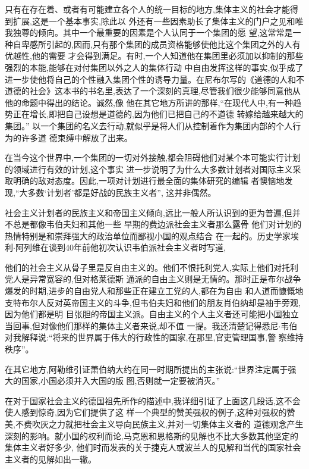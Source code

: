 ﻿\documentclass[12pt]{article}
\begin{document}
只有在存在着、或者有可能建立各个人的统一目标的地方,集体主义的社会才能得到扩展,这是一个基本事实,除此以
外还有一些因素助长了集体主义的门户之见和唯我独尊的倾向。其中一个最重要的因素是个人认同于一个集团的愿
望,这常常是一种自卑感所引起的,因而,只有那个集团的成员资格能够使他比这个集团之外的人有优越性,他的需要
才会得到满足。有时,一个人知道他在集团里必须加以抑制的那些强烈的本能,能够在对付集团以外之人的集体行动
中自由发挥这样的事实,似乎成了进一步使他将自己的个性融入集团个性的诱导力量。在尼布尔写的《道德的人和不
道德的社会》这本书的书名里,表达了一个深刻的真理,尽管我们很少能够同意他从他的命题中得出的结论。诚然,像
他在其它地方所讲的那样,``在现代人中,有一种趋势正在增长,即把自己设想是道德的,因为他们已把自己的不道德
转嫁给越来越大的集团。'' 以一个集团的名义去行动,就似乎是将人们从控制着作为集团内部的个人行为的许多道
德束缚中解放了出来。

在当今这个世界中,一个集团的一切对外接触,都会阻碍他们对某个本可能实行计划的领域进行有效的计划,这个事实
进一步说明了为什么大多数计划者对国际主义采取明确的敌对态度。因此,一项对计划进行最全面的集体研究的编辑
者懊恼地发现,``大多数‘计划者’都是好战的民族主义者'', 这并非偶然。

社会主义计划者的民族主义和帝国主义倾向,远比一般人所认识到的更为普遍,但并不总是都像韦伯夫妇和其他一些
早期的费边派社会主义者那么露骨 \myrule 他们对计划的热情特别是和崇拜强大的政治单位而鄙视小国的观点结合
在一起的。历史学家埃利$\cdot$阿列维在谈到40年前他初次认识韦伯派社会主义者时写道,

他们的社会主义从骨子里是反自由主义的。他们不恨托利党人,实际上他们对托利党人是异常宽容的,但对格莱德斯
通派的自由主义则是无情的。那时正是布尔战争爆发的时期,进步的自由党人和那些正在建立工党的人,都在为自由
和人道而慷慨地支特布尔人反对英帝国主义的斗争,但韦伯夫妇和他们的朋友肖伯纳却是袖手旁观,因为他们都是明
目张胆的帝国主义派。自由主义的个人主义者还可能把小国独立当回事,但对像他们那样的集体主义者来说,却不值
一提。我还清楚记得悉尼$\cdot$韦伯对我解释说:``将来的世界属于伟大的行政性的国家,在那里,官吏管理国事,警
察维持秩序''。

在其它地方,阿勒维引证萧伯纳大约在同一时期所提出的主张说:``世界注定属于强大的国家,小国必须并入大国的版
图,否则就一定要被消灭。''

在对于国家社会主义的德国祖先所作的描述中,我详细引证了上面这几段话,这不会使人感到惊奇,因为它们提供了这
样一个典型的赞美强权的例子,这种对强权的赞美,不费吹灰之力就把社会主义导向民族主义,并对一切集体主义者的
道德观念产生深刻的影响。就小国的权利而论,马克恩和恩格斯的见解也不比大多数其他坚定的集体主义者好多少,
他们时而发表的关于捷克人或波兰人的见解和当代的国家社会主义者的见解如出一辙。
\end{document}
